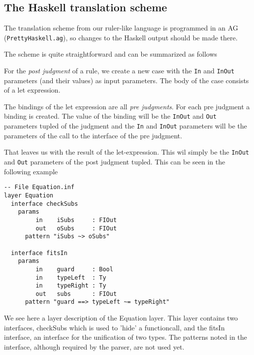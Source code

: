 \documentclass[10pt]{article}
\begin{document}
\subsection{The Haskell translation scheme}
The translation scheme from our ruler-like language is programmed in an AG (\texttt{PrettyHaskell.ag}), so changes to the Haskell output should be made there.

The scheme is quite straightforward and can be summarized as follows

For the \emph{post judgment} of a rule, we create a new case with the \texttt{In} and \texttt{InOut} parameters (and their values) as input parameters. The body of the case consists of a let expression.

The bindings of the let expression are all \emph{pre judgments}. For each pre judgment a binding is created. The value of the binding will be the \texttt{InOut} and \texttt{Out} parameters tupled of the judgment and the \texttt{In} and \texttt{InOut} parameters will be the parameters of the call to the interface of the pre judgment.

That leaves us with the result of the let-expression. This wil simply be the \texttt{InOut} and \texttt{Out} parameters of the post judgment tupled.
This can be seen in the following example

\begin{verbatim}
-- File Equation.inf
layer Equation
  interface checkSubs
    params
         in    iSubs     : FIOut
         out   oSubs     : FIOut
      pattern "iSubs ~> oSubs"

  interface fitsIn
    params
         in    guard     : Bool
         in    typeLeft  : Ty
         in    typeRight : Ty
         out   subs      : FIOut
      pattern "guard ==> typeLeft ~= typeRight"
\end{verbatim}
We see here a layer description of the Equation layer. This layer contains two interfaces, checkSubs which is used to 'hide' a functioncall, and the fitsIn interface, an interface for the unification of two types. The patterns noted in the interface, although required by the parser, are not used yet.
\end{document}
